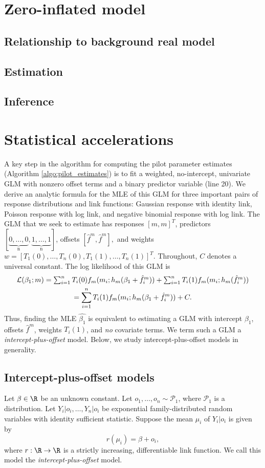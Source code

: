 \documentclass[12pt]{article}
\begin{document}
\begin{appendices}
\section{Zero-inflated model}
\subsection{Relationship to background real model}
\subsection{Estimation}
\subsection{Inference}

\section{Statistical accelerations}
A key step in the algorithm for computing the pilot parameter estimates (Algorithm \ref{algo:pilot_estimates}) is to fit a weighted, no-intercept, univariate GLM with nonzero offset terms and a binary predictor variable (line 20). We derive an analytic formula for the MLE of this GLM for three important pairs of response distributions and link functions: Gaussian response with identity link, Poisson response with log link, and negative binomial response with log link. The GLM that we seek to estimate has responses $[m,m]^T$, predictors $[\underbrace{0, \dots, 0}_\textrm{n}, \underbrace{1, \dots, 1}_\textrm{n}]$, offsets $[\hat{f}^m, \hat{f}^m],$ and weights $w = [T_1(0), \dots, T_n(0), T_1(1), \dots, T_n(1)]^T.$ Throughout, $C$ denotes a universal constant. The log likelihood of this GLM is
\begin{multline*}
$$\mathcal{L}(\beta_1; m) = \sum_{i=1}^n T_i(0) f_m(m_i; h_m(\beta_1 + \hat{f}^m_i )) + \sum_{i=1}^n T_i(1) f_m(m_i; h_m(\hat{f}^m_i)) \\ = \sum_{i=1}^n T_i(1) f_m(m_i; h_m(\beta_1 + \hat{f}^m_i )) + C.$$
\end{multline*}
Thus, finding the MLE $\hat{\beta_1}$ is equivalent to estimating a GLM with intercept $\beta_1$, offsets $\hat{f}^m$, weights $T_i(1)$, and \textit{no} covariate terms. We term such a GLM a \textit{intercept-plus-offset} model. Below, we study intercept-plus-offset models in generality.

\subsection*{Intercept-plus-offset models}
Let $\beta \in \R$ be an unknown constant. Let $o_1, \dots, o_n \sim \mathcal{P}_1$, where $\mathcal{P}_1$ is a distribution. Let $Y_i|o_i, \dots, Y_n|o_i$ be exponential family-distributed random variables with identity sufficient statistic. Suppose the mean $\mu_i$ of $Y_i|o_i$ is given by $$r(\mu_i) = \beta + o_i,$$ where $r: \R \to \R$ is a strictly increasing, differentiable link function. We call this model the \textit{intercept-plus-offset} model.


\end{appendices}
\end{document}
